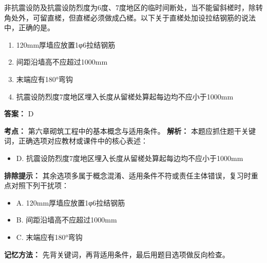 \documentclass[UTF8,fontset=fandol,11pt]{ctexart}
\begin{document}
\vspace{0.2em}

\begin{quizbox}[title={第 21 题}]
非抗震设防及抗震设防烈度为6度、7度地区的临时间断处，当不能留斜槎时，除转角处外，可留直槎，但直槎必须做成凸槎。以下关于直槎处加设拉结钢筋的说法中，正确的是。\\
\begin{enumerate}[label=\Alph*.]
\item 120mm厚墙应放置1φ6拉结钢筋
\item 间距沿墙高不应超过1000mm
\item 末端应有180°弯钩
\item 抗震设防烈度7度地区埋入长度从留槎处算起每边均不应小于1000mm
\end{enumerate}
\textbf{答案：} D
\vspace{0.25em}
\begin{answerbox}[title={考点解析}]
\textbf{考点：} 第六章砌筑工程中的基本概念与适用条件。
\textbf{解析：} 本题应抓住题干关键词，正确选项对应教材或课件中的核心表述：
\begin{itemize}
\item D. 抗震设防烈度7度地区埋入长度从留槎处算起每边均不应小于1000mm
\end{itemize}
\textbf{排除提示：} 其余选项多属于概念混淆、适用条件不符或责任主体错误，复习时重点对照下列干扰项：
\begin{itemize}
\item A. 120mm厚墙应放置1φ6拉结钢筋
\item B. 间距沿墙高不应超过1000mm
\item C. 末端应有180°弯钩
\end{itemize}
\textbf{记忆方法：} 先背关键词，再背适用条件，最后用题目选项做反向检查。
\end{answerbox}
\end{quizbox}

\vspace{0.2em}
\end{document}

